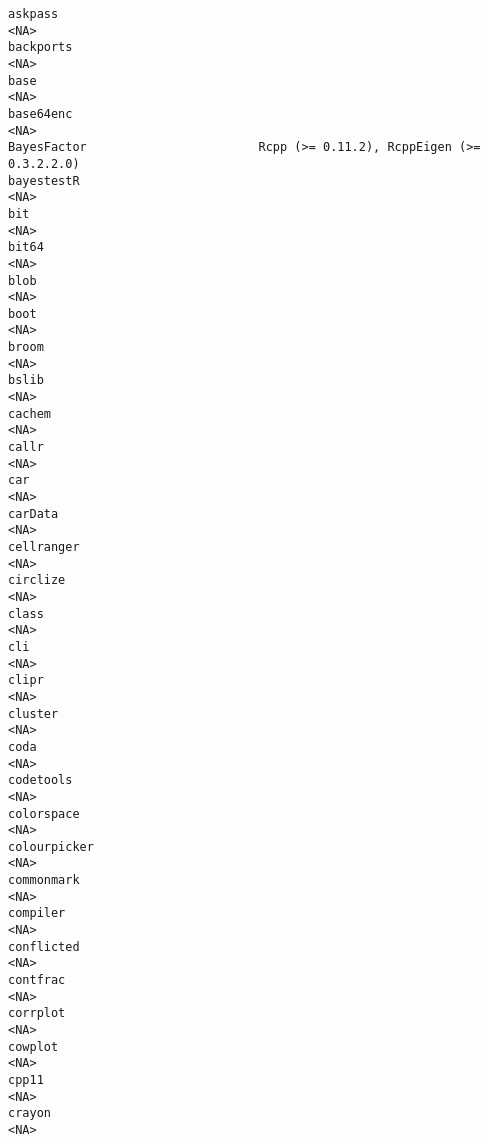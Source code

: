 \documentclass[
  letterpaper,
  DIV=11,
  numbers=noendperiod]{scrreprt}
\begin{document}
\begin{verbatim}
askpass                                                                  <NA>
backports                                                                <NA>
base                                                                     <NA>
base64enc                                                                <NA>
BayesFactor                        Rcpp (>= 0.11.2), RcppEigen (>= 0.3.2.2.0)
bayestestR                                                               <NA>
bit                                                                      <NA>
bit64                                                                    <NA>
blob                                                                     <NA>
boot                                                                     <NA>
broom                                                                    <NA>
bslib                                                                    <NA>
cachem                                                                   <NA>
callr                                                                    <NA>
car                                                                      <NA>
carData                                                                  <NA>
cellranger                                                               <NA>
circlize                                                                 <NA>
class                                                                    <NA>
cli                                                                      <NA>
clipr                                                                    <NA>
cluster                                                                  <NA>
coda                                                                     <NA>
codetools                                                                <NA>
colorspace                                                               <NA>
colourpicker                                                             <NA>
commonmark                                                               <NA>
compiler                                                                 <NA>
conflicted                                                               <NA>
contfrac                                                                 <NA>
corrplot                                                                 <NA>
cowplot                                                                  <NA>
cpp11                                                                    <NA>
crayon                                                                   <NA>

\end{verbatim}
\end{document}
